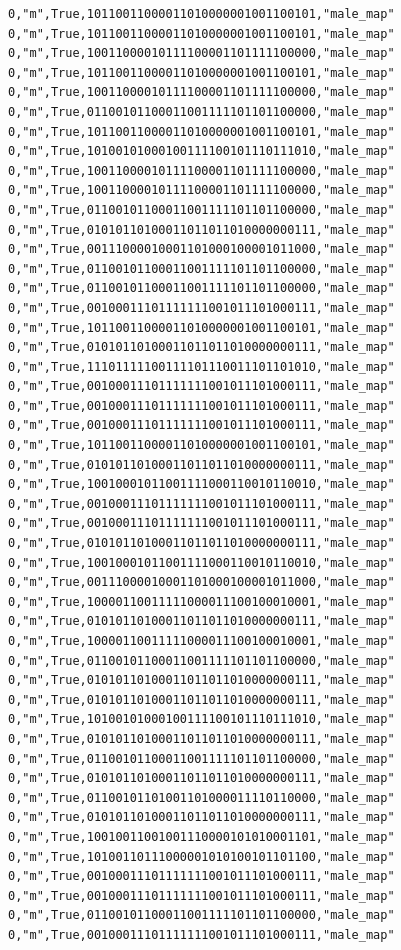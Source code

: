 \documentclass[authoryearcitations]{UoYCSproject}
\begin{document}
\begin{framed}
\begin{verbatim}
0,"m",True,10110011000011010000001001100101,"male_map"
0,"m",True,10110011000011010000001001100101,"male_map"
0,"m",True,10011000010111100001101111100000,"male_map"
0,"m",True,10110011000011010000001001100101,"male_map"
0,"m",True,10011000010111100001101111100000,"male_map"
0,"m",True,01100101100011001111101101100000,"male_map"
0,"m",True,10110011000011010000001001100101,"male_map"
0,"m",True,10100101000100111100101110111010,"male_map"
0,"m",True,10011000010111100001101111100000,"male_map"
0,"m",True,10011000010111100001101111100000,"male_map"
0,"m",True,01100101100011001111101101100000,"male_map"
0,"m",True,01010110100011011011010000000111,"male_map"
0,"m",True,00111000010001101000100001011000,"male_map"
0,"m",True,01100101100011001111101101100000,"male_map"
0,"m",True,01100101100011001111101101100000,"male_map"
0,"m",True,00100011101111111001011101000111,"male_map"
0,"m",True,10110011000011010000001001100101,"male_map"
0,"m",True,01010110100011011011010000000111,"male_map"
0,"m",True,11101111100111101110011101101010,"male_map"
0,"m",True,00100011101111111001011101000111,"male_map"
0,"m",True,00100011101111111001011101000111,"male_map"
0,"m",True,00100011101111111001011101000111,"male_map"
0,"m",True,10110011000011010000001001100101,"male_map"
0,"m",True,01010110100011011011010000000111,"male_map"
0,"m",True,10010001011001111000110010110010,"male_map"
0,"m",True,00100011101111111001011101000111,"male_map"
0,"m",True,00100011101111111001011101000111,"male_map"
0,"m",True,01010110100011011011010000000111,"male_map"
0,"m",True,10010001011001111000110010110010,"male_map"
0,"m",True,00111000010001101000100001011000,"male_map"
0,"m",True,10000110011111000011100100010001,"male_map"
0,"m",True,01010110100011011011010000000111,"male_map"
0,"m",True,10000110011111000011100100010001,"male_map"
0,"m",True,01100101100011001111101101100000,"male_map"
0,"m",True,01010110100011011011010000000111,"male_map"
0,"m",True,01010110100011011011010000000111,"male_map"
0,"m",True,10100101000100111100101110111010,"male_map"
0,"m",True,01010110100011011011010000000111,"male_map"
0,"m",True,01100101100011001111101101100000,"male_map"
0,"m",True,01010110100011011011010000000111,"male_map"
0,"m",True,01100101101001101000011110110000,"male_map"
0,"m",True,01010110100011011011010000000111,"male_map"
0,"m",True,10010011001001110000101010001101,"male_map"
0,"m",True,10100110111000001010100101101100,"male_map"
0,"m",True,00100011101111111001011101000111,"male_map"
0,"m",True,00100011101111111001011101000111,"male_map"
0,"m",True,01100101100011001111101101100000,"male_map"
0,"m",True,00100011101111111001011101000111,"male_map"

\end{verbatim}
\end{framed}
\end{document}

